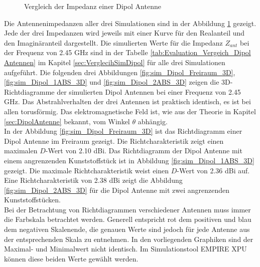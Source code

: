 \begin{figure}[!ht]
	\centering
	\begingroup
	
	\endgroup
	\caption{Vergleich der Impedanz einer Dipol Antenne}
	\label{Impedanz_Vergleich_Simulation}
\end{figure}
\newpage
Die Antennenimpedanzen aller drei Simulationen sind in der Abbildung \ref{Impedanz_Vergleich_Simulation} gezeigt. Jede der drei Impedanzen wird jeweils mit einer Kurve für den Realanteil und den Imaginäranteil dargestellt. Die simulierten Werte für die Impedanz $Z_{ant}$ bei der Frequenz von 2.45 GHz sind in der Tabelle \ref{tab:Evaluation_Vergeich_Dipol Antennen} im Kapitel \ref{sec:VerglecihSimDipol} für alle drei Simulationen aufgeführt.
\clearpage
\newpage
%
Die folgenden drei Abbildungen \ref{fig:sim_Dipol_Freiraum_3D},
\ref{fig:sim_Dipol_1ABS_3D} und 
\ref{fig:sim_Dipol_2ABS_3D} zeigen die 3D-Richtdiagramme der simulierten Dipol Antennen bei einer Frequenz von 2.45 GHz. Das Abstrahlverhalten der drei Antennen ist praktisch identisch, es ist bei allen torusförmig. Das elektromagnetische Feld ist, wie aus der Theorie in Kapitel \ref{sec:DipolAntenne} bekannt, vom Winkel $\theta$ abhängig.\\
In der Abbildung \ref{fig:sim_Dipol_Freiraum_3D} ist das Richtdiagramm einer Dipol Antenne im Freiraum gezeigt. Die Richtcharakteristik zeigt einen maximalen $D$-Wert von 2.10 dBi. Das Richtdiagramm der Dipol Antenne mit einem angrenzenden Kunststoffstück ist in Abbildung \ref{fig:sim_Dipol_1ABS_3D} gezeigt. Die maximale Richtcharakteristik weist einen $D$-Wert von 2.36 dBi auf. Eine Richtcharakteristik von 2.38 dBi zeigt die Abbildung \ref{fig:sim_Dipol_2ABS_3D} für die Dipol Antenne mit zwei angrenzenden Kunststoffstücken.\\
Bei der Betrachtung von Richtdiagrammen verschiedener Antennen muss immer die Farbskala betrachtet werden. Generell entspricht rot dem positiven und blau dem negativen Skalenende, die genauen Werte sind jedoch für jede Antenne aus der entsprechenden Skala zu entnehmen. In den vorliegenden Graphiken sind der Maximal- und Minimalwert nicht identisch. Im Simulationstool EMPIRE XPU können diese beiden Werte gewählt werden. 
